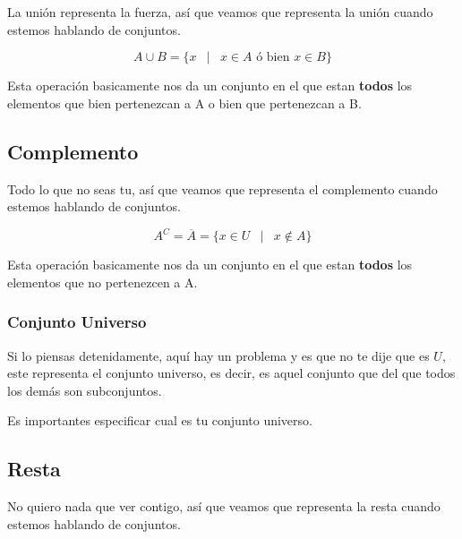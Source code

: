 \documentclass[12pt]{report}                                    %
\DeclareMathOperator \Space {\quad}                             %
\DeclareMathOperator \MiniSpace {\;}                            %
\newcommand \Such {\MiniSpace|\MiniSpace}                       %
\begin{document}
            La unión representa la fuerza, así que veamos que representa la unión cuando estemos
            hablando de conjuntos.

            \begin{equation}
                A \cup B = \{ x \Such x \in A \text{ ó bien } x \in B \}
            \end{equation}

            Esta operación basicamente nos da un conjunto en el que estan \textbf{todos} los elementos
            que bien pertenezcan a A o bien que pertenezcan a B.


        \clearpage
        \subsection{Complemento}

            Todo lo que no seas tu, así que veamos que representa el complemento cuando estemos
            hablando de conjuntos.

            \begin{equation}
                A^C = \overline A = \{ x \in U \Such x \notin A \}
            \end{equation}

            Esta operación basicamente nos da un conjunto en el que estan \textbf{todos} los elementos
            que no pertenezcen a A.

            \subsubsection{Conjunto Universo}
                Si lo piensas detenidamente, aquí hay un problema y es que no te dije que es $U$, este
                representa el conjunto universo, es decir, es aquel conjunto que del que todos los demás
                son subconjuntos.

                Es importantes especificar cual es tu conjunto universo.


        \clearpage
        \subsection{Resta}

            No quiero nada que ver contigo, así que veamos que representa la resta cuando estemos
            hablando de conjuntos.
\end{document}
